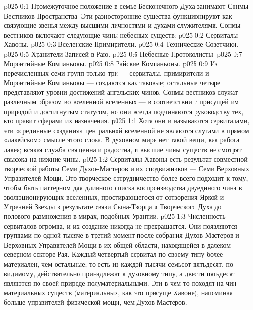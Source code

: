 \author{Облеченный Высокой Властью}
\vs p025 0:1 Промежуточное положение в семье Бесконечного Духа занимают Сонмы Вестников Пространства. Эти разносторонние существа функционируют как связующие звенья между высшими личностями и духами\hyp{}служителями. Сонмы вестников включают следующие чины небесных существ:
\vs p025 0:2 \bibnobreakspace Сервиталы Хавоны.
\vs p025 0:3 \bibnobreakspace Вселенские Примирители.
\vs p025 0:4 \bibnobreakspace Технические Советчики.
\vs p025 0:5 \bibnobreakspace Хранители Записей в Раю.
\vs p025 0:6 \bibnobreakspace Небесные Протоколисты.
\vs p025 0:7 \bibnobreakspace Моронтийные Компаньоны.
\vs p025 0:8 \bibnobreakspace Райские Компаньоны.
\vs p025 0:9 \pc Из перечисленных семи групп только три --- сервиталы, примирители и Моронтийные Компаньоны --- создаются как таковые; остальные четыре представляют уровни достижений ангельских чинов. Сонмы вестников служат различным образом во вселенной вселенных --- в соответствии с присущей им природой и достигнутым статусом, но они всегда подчиняются руководству тех, кто правит сферами их назначения.
\vs p025 1:1 Хотя они и называются сервиталами, эти «срединные создания» центральной вселенной не являются слугами в прямом «лакейском» смысле этого слова. В духовном мире нет такой вещи, как работа лакея; всякая служба священна и радостна, и высшие чины существ не смотрят свысока на нижние чины.
\vs p025 1:2 \pc Сервиталы Хавоны есть результат совместной творческой работы Семи Духов\hyp{}Мастеров и их сподвижников --- Семи Верховных Управителей Мощи. Это творческое сотрудничество более всего подходит к тому, чтобы быть паттерном для длинного списка воспроизводства двуединого чина в эволюционирующих вселенных, простирающегося от сотворения Яркой и Утренней Звезды в результате связи Сына\hyp{}Творца и Творческого Духа до полового размножения в мирах, подобных Урантии.
\vs p025 1:3 Численность сервиталов огромна, и их создание никогда не прекращается. Они появляются группами по одной тысяче в третий момент после собрания Духов\hyp{}Мастеров и Верховных Управителей Мощи в их общей области, находящейся в далеком северном секторе Рая. Каждый четвертый сервитал по своему типу более материален, чем остальные; то есть из каждой тысячи семьсот пятьдесят, по\hyp{}видимому, действительно принадлежат к духовному типу, а двести пятьдесят являются по своей природе полуматериальными. Эти  в чем\hyp{}то походят на чин материальных существ (материальных, как это присуще Хавоне), напоминая больше управителей физической мощи, чем Духов\hyp{}Мастеров.
